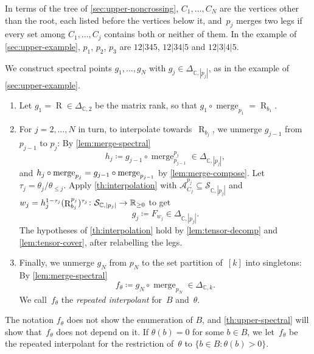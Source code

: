 \documentclass[11pt,letterpaper]{article}
\DeclareMathOperator{\tensorrank}{R}
\DeclareMathOperator{\merge}{merge}
\newcommand{\RR}{\mathbb{R}}
\newcommand{\CC}{\mathbb{C}}
\begin{document}
In terms of the tree of \cref{sec:upper-noncrossing}, $C_1, \ldots, C_N$ are the vertices other than the root, each listed before the vertices below it, and~$p_j$ merges two legs if every set among $C_1, \ldots, C_j$ contains both or neither of them. In the example of \cref{sec:upper-example}, $p_1$, $p_2$, $p_3$ are $12|345$, $12|34|5$ and $12|3|4|5$.

We construct spectral points $g_1, \ldots, g_N$ with $g_j \in \Delta_{\CC,|p_j|}$, as in the example of \cref{sec:upper-example}.
\begin{enumerate}[(1)]
\item Let $g_1 = \tensorrank \in \Delta_{\CC,2}$ be the matrix rank, so that $g_1 \circ \merge_{p_1} = \tensorrank_{b_1}$.
\item For $j = 2, \ldots, N$ in turn, to interpolate towards~$\tensorrank_{b_j}$, we unmerge $g_{j-1}$ from $p_{j-1}$ to $p_j$: By \cref{lem:merge-spectral}
\[
h_j \coloneqq g_{j-1} \circ \merge^{p_j}_{p_{j-1}} \in \Delta_{\CC,|p_j|},
\]
and $h_j \circ \merge_{\smash{p_j}} = g_{j-1} \circ \merge_{\smash{p_{j-1}}}$ by \cref{lem:merge-compose}. Let $\tau_j = \theta_j / \theta_{\leq j}$. Apply \cref{th:interpolation} with $\mathcal{A}^{p_j}_{C_j} \subseteq \mathcal{S}_{\CC,|p_j|}$ and $w_j = h_j^{\smash{1-\tau_j}} (\tensorrank^{p_j}_{b_j})^{\tau_j} \colon \mathcal{S}_{\CC,|p_j|} \to \RR_{\geq 0}$ to get
\[
g_j \coloneqq F_{w_j} \in \Delta_{\CC,|p_j|}.
\]
The hypotheses of \cref{th:interpolation} hold by \cref{lem:tensor-decomp} and \cref{lem:tensor-cover}, after relabelling the legs.
\item Finally, we unmerge $g_N$ from $p_N$ to the set partition of~$[k]$ into singletons: By \cref{lem:merge-spectral}
\[
f_\theta \coloneqq g_N \circ \merge_{p_N} \in \Delta_{\CC,k}.
\]
We call~$f_\theta$ the \emph{repeated interpolant} for~$B$ and~$\theta$.
\end{enumerate}
The notation $f_\theta$ does not show the enumeration of $B$, and \cref{th:upper-spectral} will show that~$f_\theta$ does not depend on it. If $\theta(b) = 0$ for some $b \in B$, we let~$f_\theta$ be the repeated interpolant for the restriction of~$\theta$ to $\{b \in B : \theta(b) > 0\}$. 
\end{document}
